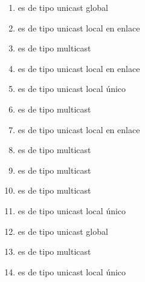 \documentclass[letterpaper,10pt,spanish]{sphinxmanual}
\begin{document}
\begin{enumerate}
\item {} 
\sphinxAtStartPar
{} es de tipo unicast global

\item {} 
\sphinxAtStartPar
{} es de tipo unicast local en enlace

\item {} 
\sphinxAtStartPar
{} es de tipo multicast

\item {} 
\sphinxAtStartPar
{} es de tipo unicast local en enlace

\item {} 
\sphinxAtStartPar
{} es de tipo unicast local único

\item {} 
\sphinxAtStartPar
{} es de tipo multicast

\item {} 
\sphinxAtStartPar
{} es de tipo unicast local en enlace

\item {} 
\sphinxAtStartPar
{} es de tipo multicast

\item {} 
\sphinxAtStartPar
{} es de tipo multicast

\item {} 
\sphinxAtStartPar
{} es de tipo multicast

\item {} 
\sphinxAtStartPar
{} es de tipo unicast local único

\item {} 
\sphinxAtStartPar
{} es de tipo unicast global

\item {} 
\sphinxAtStartPar
{} es de tipo multicast

\item {} 
\sphinxAtStartPar
{} es de tipo unicast local único


\end{enumerate}
\end{document}

